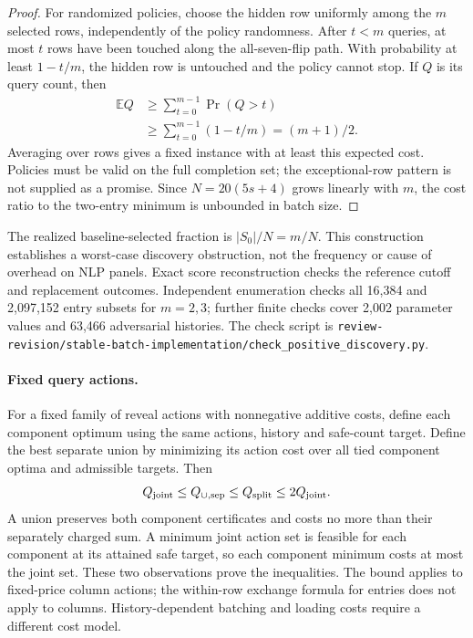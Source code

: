 \begin{proof}
For randomized policies, choose the hidden row uniformly among the $m$ selected rows, independently of the policy randomness. After $t<m$ queries, at most $t$ rows have been touched along the all-seven-flip path. With probability at least $1-t/m$, the hidden row is untouched and the policy cannot stop. If $Q$ is its query count, then
\[
 \begin{aligned}
 \mathbb E Q&\ge\sum_{t=0}^{m-1}\Pr(Q>t)\\
 &\ge\sum_{t=0}^{m-1}(1-t/m)=(m+1)/2.
 \end{aligned}
\]
Averaging over rows gives a fixed instance with at least this expected cost. Policies must be valid on the full completion set; the exceptional-row pattern is not supplied as a promise. Since $N=20(5s+4)$ grows linearly with $m$, the cost ratio to the two-entry minimum is unbounded in batch size.
\end{proof}

The realized baseline-selected fraction is $|S_0|/N=m/N$. This construction establishes a worst-case discovery obstruction, not the frequency or cause of overhead on NLP panels. Exact score reconstruction checks the reference cutoff and replacement outcomes. Independent enumeration checks all 16,384 and 2,097,152 entry subsets for $m=2,3$; further finite checks cover 2,002 parameter values and 63,466 adversarial histories. The check script is \nolinkurl{review-revision/stable-batch-implementation/check_positive_discovery.py}.

\paragraph{Fixed query actions.}
For a fixed family of reveal actions with nonnegative additive costs, define each component optimum using the same actions, history and safe-count target. Define the best separate union by minimizing its action cost over all tied component optima and admissible targets. Then
\[
 Q_{\rm joint}\le Q_{\cup,\rm sep}\le Q_{\rm split}\le2Q_{\rm joint}.
\]
A union preserves both component certificates and costs no more than their separately charged sum. A minimum joint action set is feasible for each component at its attained safe target, so each component minimum costs at most the joint set. These two observations prove the inequalities. The bound applies to fixed-price column actions; the within-row exchange formula for entries does not apply to columns. History-dependent batching and loading costs require a different cost model.

